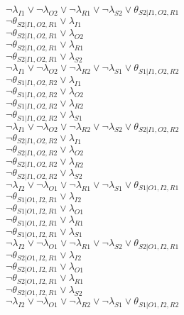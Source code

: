 $\neg\lambda_{I1} \vee \neg\lambda_{O2} \vee \neg\lambda_{R1} \vee \neg\lambda_{S2} \vee \theta_{S2|I1,O2,R1}$\\
$\neg\theta_{S2|I1,O2,R1} \vee \lambda_{I1}$\\
$\neg\theta_{S2|I1,O2,R1} \vee \lambda_{O2}$\\
$\neg\theta_{S2|I1,O2,R1} \vee \lambda_{R1}$\\
$\neg\theta_{S2|I1,O2,R1} \vee \lambda_{S2}$\\
$\neg\lambda_{I1} \vee \neg\lambda_{O2} \vee \neg\lambda_{R2} \vee \neg\lambda_{S1} \vee \theta_{S1|I1,O2,R2}$\\
$\neg\theta_{S1|I1,O2,R2} \vee \lambda_{I1}$\\
$\neg\theta_{S1|I1,O2,R2} \vee \lambda_{O2}$\\
$\neg\theta_{S1|I1,O2,R2} \vee \lambda_{R2}$\\
$\neg\theta_{S1|I1,O2,R2} \vee \lambda_{S1}$\\
$\neg\lambda_{I1} \vee \neg\lambda_{O2} \vee \neg\lambda_{R2} \vee \neg\lambda_{S2} \vee \theta_{S2|I1,O2,R2}$\\
$\neg\theta_{S2|I1,O2,R2} \vee \lambda_{I1}$\\
$\neg\theta_{S2|I1,O2,R2} \vee \lambda_{O2}$\\
$\neg\theta_{S2|I1,O2,R2} \vee \lambda_{R2}$\\
$\neg\theta_{S2|I1,O2,R2} \vee \lambda_{S2}$\\
$\neg\lambda_{I2} \vee \neg\lambda_{O1} \vee \neg\lambda_{R1} \vee \neg\lambda_{S1} \vee \theta_{S1|O1,I2,R1}$\\
$\neg\theta_{S1|O1,I2,R1} \vee \lambda_{I2}$\\
$\neg\theta_{S1|O1,I2,R1} \vee \lambda_{O1}$\\
$\neg\theta_{S1|O1,I2,R1} \vee \lambda_{R1}$\\
$\neg\theta_{S1|O1,I2,R1} \vee \lambda_{S1}$\\
$\neg\lambda_{I2} \vee \neg\lambda_{O1} \vee \neg\lambda_{R1} \vee \neg\lambda_{S2} \vee \theta_{S2|O1,I2,R1}$\\
$\neg\theta_{S2|O1,I2,R1} \vee \lambda_{I2}$\\
$\neg\theta_{S2|O1,I2,R1} \vee \lambda_{O1}$\\
$\neg\theta_{S2|O1,I2,R1} \vee \lambda_{R1}$\\
$\neg\theta_{S2|O1,I2,R1} \vee \lambda_{S2}$\\
$\neg\lambda_{I2} \vee \neg\lambda_{O1} \vee \neg\lambda_{R2} \vee \neg\lambda_{S1} \vee \theta_{S1|O1,I2,R2}$\\
